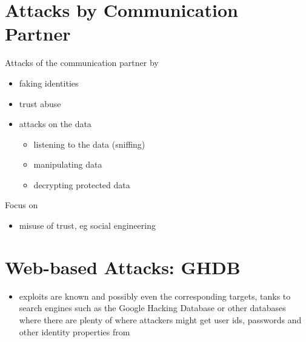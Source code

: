 \documentclass[11pt]{article}
\begin{document}
\section{Attacks by Communication Partner}
\label{sec:orgd852f8f}
Attacks of the communication partner by
\begin{itemize}
\item faking identities
\item trust abuse
\item attacks on the data
\begin{itemize}
\item listening to the data (sniffing)
\item manipulating data
\item decrypting protected data
\end{itemize}
\end{itemize}

Focus on
\begin{itemize}
\item misuse of trust, eg social engineering
\end{itemize}

\section{Web-based Attacks: GHDB}
\label{sec:org0ffcb1e}
\begin{itemize}
\item exploits are known and possibly even the corresponding targets, tanks to search engines such as the Google Hacking Database or other databases where there are plenty of where attackers might get user ids, passwords and other identity properties from
\end{itemize}
\end{document}
